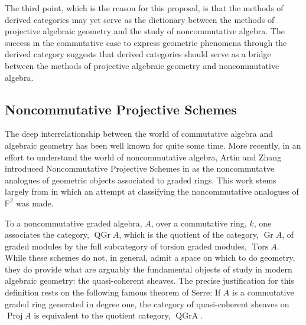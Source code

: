 \documentclass[11pt]{article}
\begin{document}
The third point, which is the reason for this proposal, is that the methods of derived categories may yet serve as the dictionary between the methods of projective algebraic geometry and the study of noncommutative algebra.
The success in the commutative case to express geometric phenomena through the derived category suggests that derived categories should serve as a bridge between the methods of projective algebraic geometry and noncommutative algebra.

\subsection{Noncommutative Projective Schemes}
The deep interrelationship between the world of commutative algebra and algebraic geometry has been well known for quite some time.
More recently, in an effort to understand the world of noncommutative algebra, Artin and Zhang introduced Noncommutative Projective Schemes in \cite{AZ94} as the noncommutatve analogues of geometric objects associated to graded rings.
This work stems largely from \cite{AS87} in which an attempt at classifying the noncommutative analogues of $\mathbb{P}^2$ was made.

To a noncommutative graded algebra, $A$, over a commutative ring, $k$, one associates the category, $\operatorname{QGr} A$, which is the quotient of the category, $\operatorname{Gr} A$, of graded modules by the full subcategory of torsion graded modules, $\operatorname{Tors} A$.
While these schemes do not, in general, admit a space on which to do geometry, they do provide what are arguably the fundamental objects of study in modern algebraic geometry: the quasi-coherent sheaves.
The  precise justification for this definition rests on the following famous theorem of Serre: If $A$ is a commutative graded ring generated in degree one, the category of quasi-coherent sheaves on $\operatorname{Proj} A$ is equivalent to the quotient category, $\operatorname{QGr A}$.
\end{document}
